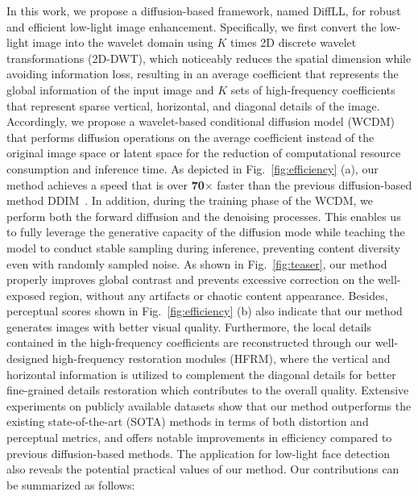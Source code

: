 In this work, we propose a diffusion-based framework, named DiffLL, for robust and efficient low-light image enhancement. Specifically, we first convert the low-light image into the wavelet domain using $K$ times 2D discrete wavelet transformations (2D-DWT), which noticeably reduces the spatial dimension while avoiding information loss, resulting in an average coefficient that represents the global information of the input image and $K$ sets of high-frequency coefficients that represent sparse vertical, horizontal, and diagonal details of the image. Accordingly, we propose a wavelet-based conditional diffusion model (WCDM) that performs diffusion operations on the average coefficient instead of the original image space or latent space for the reduction of computational resource consumption and inference time. As depicted in Fig.~\ref{fig:efficiency} (a), our method achieves a speed that is over \textbf{70$\times$} faster than the previous diffusion-based method DDIM~\cite{ddim}. In addition, during the training phase of the WCDM, we perform both the forward diffusion and the denoising processes. This enables us to fully leverage the generative capacity of the diffusion mode while teaching the model to conduct stable sampling during inference, preventing content diversity even with randomly sampled noise. As shown in Fig.~\ref{fig:teaser}, our method properly improves global contrast and prevents excessive correction on the well-exposed region, without any artifacts or chaotic content appearance. Besides, perceptual scores shown in Fig.~\ref{fig:efficiency} (b) also indicate that our method generates images with better visual quality. Furthermore, the local details contained in the high-frequency coefficients are reconstructed through our well-designed high-frequency restoration modules (HFRM), where the vertical and horizontal information is utilized to complement the diagonal details for better fine-grained details restoration which contributes to the overall quality. Extensive experiments on publicly available datasets show that our method outperforms the existing state-of-the-art (SOTA) methods in terms of both distortion and perceptual metrics, and offers notable improvements in efficiency compared to previous diffusion-based methods. The application for low-light face detection also reveals the potential practical values of our method. Our contributions can be summarized as follows:
